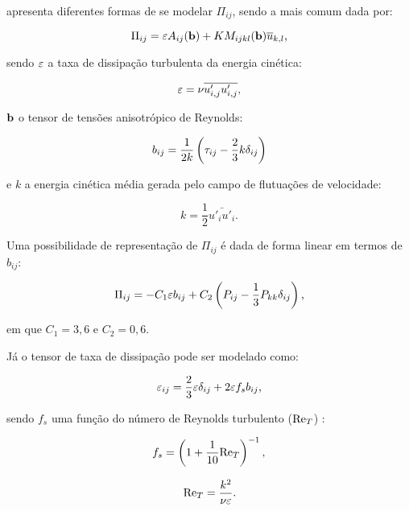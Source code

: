 \documentclass[_ArquivoPrincipal.tex]{subfiles}
\begin{document}
 apresenta diferentes formas de se modelar $\Pi_{ij}$, sendo a mais comum dada por:

\begin{equation}
    \Pi_{ij}=\varepsilon A_{ij}(\mathbf{b})+KM_{ijkl}(\mathbf{b})\overline{u}_{k,l}\text{,}
\end{equation}

\noindent sendo $\varepsilon$ a taxa de dissipação turbulenta da energia cinética:

\begin{equation}
    \varepsilon=\nu\overline{u'_{i,j}u'_{i,j}}\text{,}
\end{equation}

\noindent $\mathbf{b}$ o tensor de tensões anisotrópico de Reynolds:

\begin{equation}
    b_{ij}=\frac{1}{2k}\left({\tau_{ij}-\frac{2}{3}k\delta_{ij}}\right)
\end{equation}

\noindent e $k$ a energia cinética média gerada pelo campo de flutuações de velocidade:

\begin{equation}
    k=\frac{1}{2}\bar{u'_iu'_i}\text{.}
\end{equation}

Uma possibilidade de representação de $\Pi_{ij}$ é dada de forma linear em termos de $b_{ij}$:

\begin{equation}
    \Pi_{ij}=-C_1\varepsilon b_{ij}+C_2\left({P_{ij}-\frac{1}{3}P_{kk}\delta_{ij}}\right)\text{,}
\end{equation}

\noindent em que $C_1=3,6$ e $C_2=0,6$.

Já o tensor de taxa de dissipação pode ser modelado como:

\begin{equation}
    \varepsilon_{ij}=\frac{2}{3}\varepsilon\delta_{ij}+2\varepsilon f_s b_{ij}\text{,}
\end{equation}

\noindent sendo $f_s$ uma função do número de Reynolds turbulento ($\mathrm{Re}_T$) \cite{hanjalic1976contribution}:

\begin{equation}
    f_s=\left({1+\frac{1}{10}\mathrm{Re}_T}\right)^{-1}\text{,}
\end{equation}

\begin{equation}
    \mathrm{Re}_T=\frac{k^2}{\nu\varepsilon}\text{.}
\end{equation}
\end{document}
